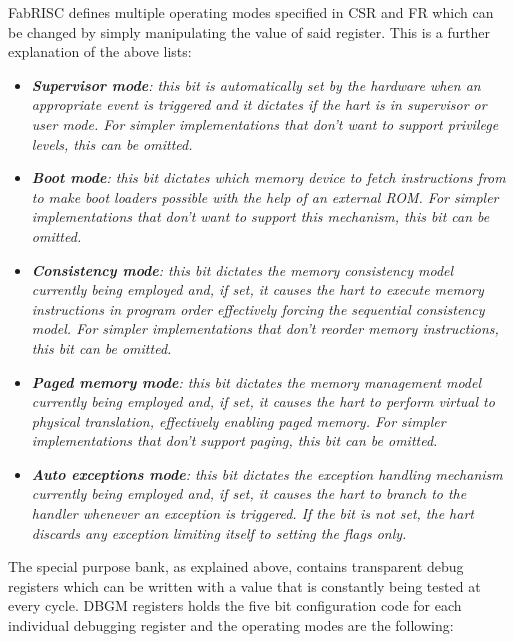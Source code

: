\documentclass{article}
\begin{document}
                FabRISC defines multiple operating modes specified in CSR and FR which can be changed by simply manipulating the value of said register. This is a further explanation of the above lists:

                \begin{itemize}

                    \item \textit{\textbf{Supervisor mode}: this bit is automatically set by the hardware when an appropriate event is triggered and it dictates if the hart is in supervisor or user mode. For simpler implementations that don't want to support privilege levels, this can be omitted.}

                    \item \textit{\textbf{Boot mode}: this bit dictates which memory device to fetch instructions from to make boot loaders possible with the help of an external ROM. For simpler implementations that don't want to support this mechanism, this bit can be omitted.}

                    \item \textit{\textbf{Consistency mode}: this bit dictates the memory consistency model currently being employed and, if set, it causes the hart to execute memory instructions in program order effectively forcing the sequential consistency model. For simpler implementations that don't reorder memory instructions, this bit can be omitted.}

                    \item \textit{\textbf{Paged memory mode}: this bit dictates the memory management model currently being employed and, if set, it causes the hart to perform virtual to physical translation, effectively enabling paged memory. For simpler implementations that don't support paging, this bit can be omitted.}

                    \item \textit{\textbf{Auto exceptions mode}: this bit dictates the exception handling mechanism currently being employed and, if set, it causes the hart to branch to the handler whenever an exception is triggered. If the bit is not set, the hart discards any exception limiting itself to setting the flags only.}

                \end{itemize}

                \vspace{10pt}

                The special purpose bank, as explained above, contains transparent debug registers which can be written with a value that is constantly being tested at every cycle. DBGM registers holds the five bit configuration code for each individual debugging register and the operating modes are the following:
\end{document}
